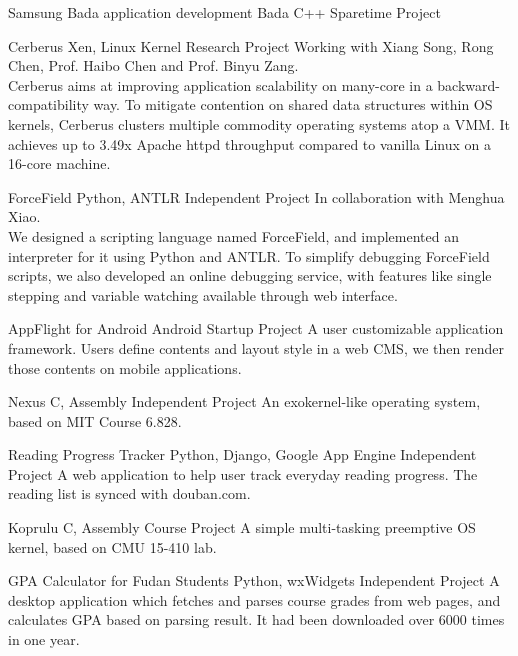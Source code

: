 \documentclass[11pt,a4paper]{moderncv}
\begin{document}
\vspace*{0.2\baselineskip}
{Samsung Bada application development}
{Bada C++}
{Sparetime Project}{}
{
}

\vspace*{0.2\baselineskip}
{Cerberus}
{Xen, Linux Kernel}
{Research Project}{}
{Working with Xiang Song, Rong Chen, Prof. Haibo Chen and Prof. Binyu Zang. \\
Cerberus aims at improving application scalability on many-core in a
backward-compatibility way. To mitigate contention on shared data
structures within OS kernels, Cerberus clusters multiple commodity
operating systems atop a VMM. It achieves up to 3.49x Apache httpd
throughput compared to vanilla Linux on a 16-core machine.
}

\vspace*{0.2\baselineskip}
{ForceField}
{Python, ANTLR}
{Independent Project}{}
{In collaboration with Menghua Xiao. \\
We designed a scripting language named ForceField, and implemented an
interpreter for it using Python and ANTLR. To simplify debugging
ForceField scripts, we also developed an online debugging service,
with features like single stepping and variable watching available
through web interface.
}

\vspace*{0.2\baselineskip}
{AppFlight for Android}
{Android}
{Startup Project}{}
{
A user customizable application framework. Users define contents and
layout style in a web CMS, we then render those contents on mobile
applications.
}

\vspace*{0.2\baselineskip}
{Nexus}
{C, Assembly}
{Independent Project}{}
{
An exokernel-like operating system, based on MIT Course 6.828.
}

\vspace*{0.2\baselineskip}
{Reading Progress Tracker}
{Python, Django, Google App Engine}
{Independent Project}{}
{
A web application to help user track everyday reading progress. The reading list is synced with douban.com.
}

\vspace*{0.2\baselineskip}
{Koprulu}
{C, Assembly}
{Course Project}{}
{
A simple multi-tasking preemptive OS kernel, based on CMU 15-410 lab.
}

\vspace*{0.2\baselineskip}
{GPA Calculator for Fudan Students}
{Python, wxWidgets}
{Independent Project}{}
{
A desktop application which fetches and parses course grades from web
pages, and calculates GPA based on parsing result. It had been
downloaded over 6000 times in one year.
}
\end{document}
